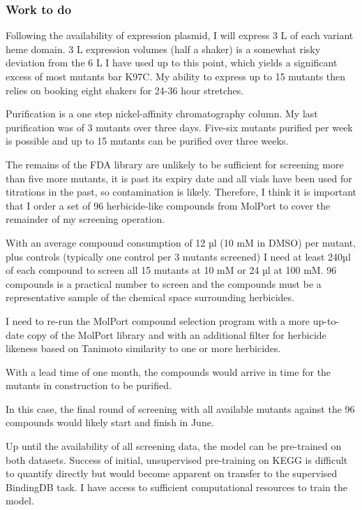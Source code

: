 \documentclass{article}
\begin{document}
\subsubsection{Work to do}
Following the availability of expression plasmid, I will express 3 L of each variant heme domain. 3 L expression volumes (half a shaker) is a somewhat risky deviation from the 6 L I have used up to this point, which yields a significant excess of most mutants bar K97C. My ability to express up to 15 mutants then relies on booking eight shakers for 24-36 hour stretches. %
\par
Purification is a one step nickel-affinity chromatography column. My last purification was of 3 mutants over three days. Five-six mutants purified per week is possible and up to 15 mutants can be purified over three weeks.
\par
The remains of the FDA library are unlikely to be sufficient for screening more than five more mutants, it is past its expiry date and all vials have been used for titrations in the past, so contamination is likely. Therefore, I think it is important that I order a set of 96 herbicide-like compounds from MolPort to cover the remainder of my screening operation. %
\par
With an average compound consumption of 12 µl (10 mM in DMSO) per mutant, plus controls (typically one control per 3 mutants screened) I need at least 240µl of each compound to screen all 15 mutants at 10 mM or 24 µl at 100 mM. 96 compounds is a practical number to screen and the compounds must be a representative sample of the chemical space surrounding herbicides. 
\par
I need to re-run the MolPort compound selection program with a more up-to-date copy of the MolPort library and with an additional filter for herbicide likeness based on Tanimoto similarity to one or more herbicides.
\par
With a lead time of one month, the compounds would arrive in time for the mutants in construction to be purified. %
\par 
In this case, the final round of screening with all available mutants against the 96 compounds would likely start and finish in June. 
\par 
Up until the availability of all screening data, the model can be pre-trained on both datasets. Success of initial, unsupervised pre-training on KEGG is difficult to quantify directly but would become apparent on transfer to the supervised BindingDB task. I have access to sufficient computational resources to train the model.
\end{document}
